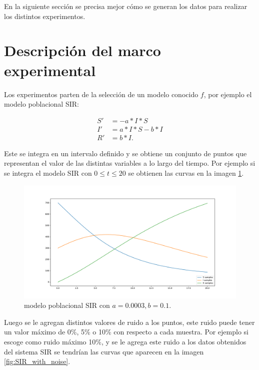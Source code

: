 En la siguiente sección se precisa mejor cómo se generan los datos para realizar los distintos experimentos.

\section{Descripción del marco experimental}

Los experimentos parten de la selección de un modelo conocido $f$, por ejemplo el modelo poblacional SIR:

\begin{align*}
    S' & = - a*I*S     \\
    I' & = a*I*S - b*I \\
    R' & = b*I.
\end{align*}

Este se integra en un intervalo definido y se obtiene un conjunto de puntos que representan el valor de las distintas variables a lo largo del tiempo. Por ejemplo si se integra el modelo SIR con $0 \leq t \leq 20$ se obtienen las curvas en la imagen \ref{fig:SIR}.

\begin{figure}[h]
    \centering
    \includegraphics[width=\textwidth]{"figures/SIR.pdf"}
    \caption{modelo poblacional SIR con $a = 0.0003, b = 0.1$.}
    \label{fig:SIR}
\end{figure}

Luego se le agregan distintos valores de ruido a los puntos, este ruido puede tener un valor máximo de 0\%, 5\% o 10\% con respecto a cada muestra. Por ejemplo si escoge como ruido máximo 10\%, y se le agrega este ruido a los datos obtenidos del sistema SIR se tendrían las curvas que aparecen en la imagen \ref{fig:SIR_with_noise}.

